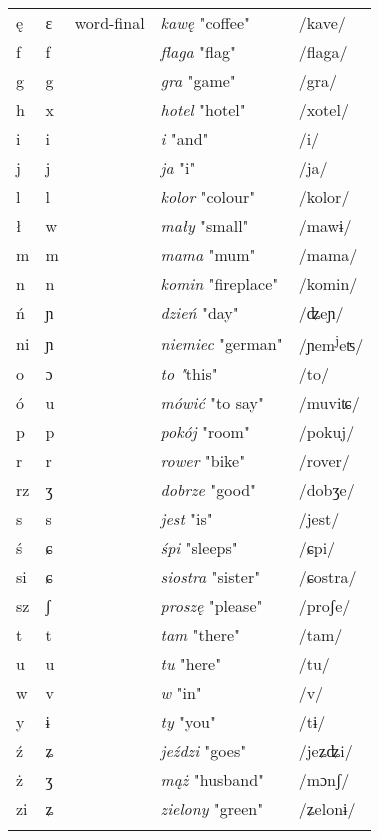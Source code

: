 \begin{table}
\begin{tabular}{lllll}
        ę & ɛ & word-final & \textit{kawę} "coffee" & /kave/\\
        f & f &  & \textit{flaga} "flag" & /flaga/\\
        g & g &  & \textit{gra} "game" & /gra/\\
        h & x &  & \textit{hotel} "hotel" & /xotel/\\
        i & i &  & \textit{i} "and" & /i/\\
        j & j &  & \textit{ja} "i" & /ja/\\
        l & l &  & \textit{kolor} "colour" & /kolor/\\
        ł & w &  & \textit{mały} "small" & /mawɨ/\\
        m & m &  & \textit{mama} "mum" & /mama/\\
        n & n &  & \textit{komin} "fireplace" & /komin/\\
        ń & ɲ &  & \textit{dzień} "day" & /ʥeɲ/\\
        ni & ɲ &  & \textit{niemiec} "german" & /ɲem\textsuperscript{j}eʦ/\\
        o & ɔ &  & \textit{to} \textit{"}this" & /to/\\
        ó & u &  & \textit{mówić} "to say" & /muviʨ/\\
        p & p &  & \textit{pokój} "room" & /pokuj/\\
        r & r &  & \textit{rower} "bike" & /rover/\\
        rz & ʒ &  & \textit{dobrze} "good" & /dobʒe/\\
        s & s &  & \textit{jest} "is" & /jest/\\
        ś & ɕ &  & \textit{śpi} "sleeps" & /ɕpi/\\
        si & ɕ &  & \textit{siostra} "sister" & /ɕostra/\\
        sz & ʃ &  & \textit{proszę} "please" & /proʃe/\\
        t & t &  & \textit{tam} "there" & /tam/\\
        u & u &  & \textit{tu} "here" & /tu/\\
        w & v &  & \textit{w} "in" & /v/\\
        y & ɨ &  & \textit{ty} "you" & /tɨ/\\
        ź & ʑ &  & \textit{jeździ} "goes" & /jeʑʥi/\\
        ż & ʒ &  & \textit{mąż} "husband" & /mɔnʃ/\\
        zi & ʑ &  & \textit{zielony} "green" & /ʑelonɨ/\\
        \lspbottomrule
    \end{tabular}
    \caption{\missingcaption}
    \label{tab:10.1}
\end{table}

